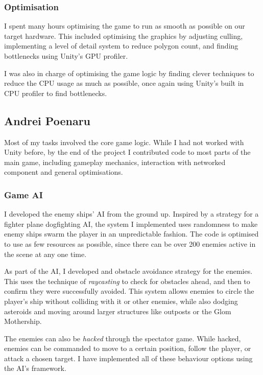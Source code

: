 \documentclass[a4paper,11pt]{article}
\begin{document}
\subsubsection{Optimisation}
I spent many hours optimising the game to run as smooth as possible on our target hardware. This included optimising the graphics by adjusting culling, implementing a level of detail system to reduce polygon count, and finding bottlenecks using Unity’s GPU profiler.

I was also in charge of optimising the game logic by finding clever techniques to reduce the CPU usage as much as possible, once again using Unity’s built in CPU profiler to find bottlenecks.

\clearpage

\subsection{Andrei Poenaru}

Most of my tasks involved the core game logic. While I had not worked with Unity before, by the end of the project I contributed code to most parts of the main game, including gameplay mechanics, interaction with networked component and general optimisations.

\subsubsection{Game AI}

I developed the enemy ships’ AI from the ground up. Inspired by a strategy for a fighter plane dogfighting AI, the system I implemented uses randomness to make enemy ships swarm the player in an unpredictable fashion. The code is optimised to use as few resources as possible, since there can be over 200 enemies active in the scene at any one time.

As part of the AI, I developed and obstacle avoidance strategy for the enemies. This uses the technique of \emph{raycasting} to check for obstacles ahead, and then to confirm they were successfully avoided. This system allows enemies to circle the player’s ship without colliding with it or other enemies, while also dodging asteroids and moving around larger structures like outposts or the Glom Mothership.

The enemies can also be \emph{hacked} through the spectator game. While hacked, enemies can be commanded to move to a certain position, follow the player, or attack a chosen target. I have implemented all of these behaviour options using the AI’s framework.
\end{document}
